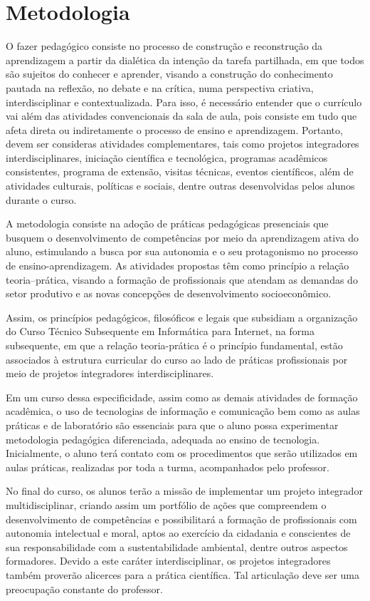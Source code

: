 \documentclass[
	12pt,				%
	openright,			%
	twoside,			%
	a4paper,			%
	chapter=TITLE,		%
	english,			%
	french,				%
	spanish,			%
	brazil,				%
	]{abntex2}
\begin{document}
\chapter{Metodologia}


O fazer pedagógico consiste no processo de construção e reconstrução da
aprendizagem a partir da dialética da intenção da tarefa partilhada, em que
todos são sujeitos do conhecer e aprender, visando a construção do conhecimento
pautada na reflexão, no debate e na crítica, numa perspectiva criativa,
interdisciplinar e contextualizada.
Para isso, é necessário entender que o currículo vai além das atividades
convencionais da sala de aula, pois consiste em tudo que afeta direta ou
indiretamente o processo de ensino e aprendizagem. Portanto, devem ser
consideras atividades complementares, tais como {projetos integradores}
interdisciplinares, iniciação científica e tecnológica, programas acadêmicos
consistentes, programa de extensão, visitas técnicas, eventos científicos, além
de atividades culturais, políticas e sociais, dentre outras desenvolvidas pelos
alunos durante o curso.

A metodologia consiste na adoção de práticas pedagógicas presenciais que busquem
o desenvolvimento de competências por meio da aprendizagem ativa do aluno,
estimulando a busca por sua autonomia e o seu protagonismo no processo de
ensino-aprendizagem. As atividades propostas têm como princípio a relação
teoria–prática, visando a formação de profissionais que atendam as demandas do
setor produtivo e as novas concepções de desenvolvimento socioeconômico.

Assim, os princípios pedagógicos, filosóficos e legais que subsidiam a
organização do Curso Técnico Subsequente em Informática para Internet, na forma
subsequente, em que a relação teoria-prática é o princípio fundamental, estão
associados à estrutura curricular do curso ao lado de práticas profissionais por
meio de projetos integradores interdisciplinares.

Em um curso dessa especificidade, assim como as demais atividades de formação
acadêmica, o uso de tecnologias de informação e comunicação bem como as aulas
práticas e de laboratório são essenciais para que o aluno possa experimentar
metodologia pedagógica diferenciada, adequada ao ensino de tecnologia.
Inicialmente, o aluno terá contato com os procedimentos que serão utilizados em
aulas práticas, realizadas por toda a turma, acompanhados pelo professor. 


No final do curso, os alunos terão a missão de implementar um projeto integrador multidisciplinar, criando assim um portfólio de ações que
compreendem o desenvolvimento de competências e possibilitará a formação de
profissionais com autonomia intelectual e moral, aptos ao exercício da cidadania
e conscientes de sua responsabilidade com a sustentabilidade ambiental, dentre
outros aspectos formadores. Devido a este caráter interdisciplinar, os projetos integradores também proverão
alicerces para a prática científica. Tal articulação deve ser uma preocupação
constante do professor. 
\end{document}
